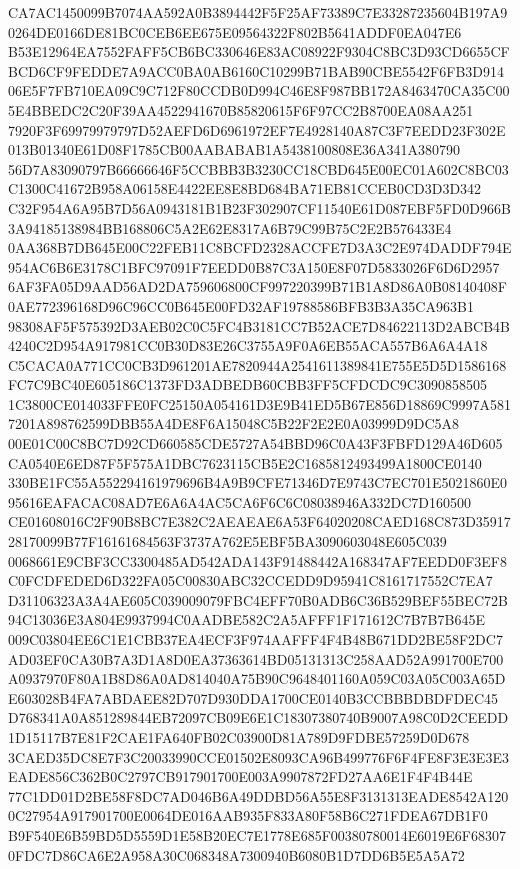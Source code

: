\documentclass[UTF8,fontset=fandol,zihao=-4,a4paper]{ctexart}
\begin{document}
{{CA7AC1450099B7074AA592A0B3894442F5F25AF73389C7E33287235604B197A90264DE0166DE81BC0CEB6EE675E09564322F802B5641ADDF0EA047E6
B53E12964EA7552FAFF5CB6BC330646E83AC08922F9304C8BC3D93CD6655CFBCD6CF9FEDDE7A9ACC0BA0AB6160C10299B71BAB90CBE5542F6FB3D914
06E5F7FB710EA09C9C712F80CCDB0D994C46E8F987BB172A8463470CA35C005E4BBEDC2C20F39AA4522941670B85820615F6F97CC2B8700EA08AA251
7920F3F69979979797D52AEFD6D6961972EF7E4928140A87C3F7EEDD23F302E013B01340E61D08F1785CB00AABABAB1A5438100808E36A341A380790
56D7A83090797B66666646F5CCBBB3B3230CC18CBD645E00EC01A602C8BC03C1300C41672B958A06158E4422EE8E8BD684BA71EB81CCEB0CD3D3D342
C32F954A6A95B7D56A0943181B1B23F302907CF11540E61D087EBF5FD0D966B3A94185138984BB168806C5A2E62E8317A6B79C99B75C2E2B576433E4
0AA368B7DB645E00C22FEB11C8BCFD2328ACCFE7D3A3C2E974DADDF794E954AC6B6E3178C1BFC97091F7EEDD0B87C3A150E8F07D5833026F6D6D2957
6AF3FA05D9AAD56AD2DA759606800CF997220399B71B1A8D86A0B08140408F0AE772396168D96C96CC0B645E00FD32AF19788586BFB3B3A35CA963B1
98308AF5F575392D3AEB02C0C5FC4B3181CC7B52ACE7D84622113D2ABCB4B4240C2D954A917981CC0B30D83E26C3755A9F0A6EB55ACA557B6A6A4A18
C5CACA0A771CC0CB3D961201AE7820944A2541611389841E755E5D5D1586168FC7C9BC40E605186C1373FD3ADBEDB60CBB3FF5CFDCDC9C3090858505
1C3800CE014033FFE0FC25150A054161D3E9B41ED5B67E856D18869C9997A5817201A898762599DBB55A4DE8F6A15048C5B22F2E2E0A03999D9DC5A8
00E01C00C8BC7D92CD660585CDE5727A54BBD96C0A43F3FBFD129A46D605CA0540E6ED87F5F575A1DBC7623115CB5E2C1685812493499A1800CE0140
330BE1FC55A552294161979696B4A9B9CFE71346D7E9743C7EC701E5021860E095616EAFACAC08AD7E6A6A4AC5CA6F6C6C08038946A332DC7D160500
CE01608016C2F90B8BC7E382C2AEAEAE6A53F64020208CAED168C873D3591728170099B77F16161684563F3737A762E5EBF5BA3090603048E605C039
0068661E9CBF3CC3300485AD542ADA143F91488442A168347AF7EEDD0F3EF8C0FCDFEDED6D322FA05C00830ABC32CCEDD9D95941C8161717552C7EA7
D31106323A3A4AE605C039009079FBC4EFF70B0ADB6C36B529BEF55BEC72B94C13036E3A804E9937994C0AADBE582C2A5AFFF1F171612C7B7B7B645E
009C03804EE6C1E1CBB37EA4ECF3F974AAFFF4F4B48B671DD2BE58F2DC7AD03EF0CA30B7A3D1A8D0EA37363614BD05131313C258AAD52A991700E700
A0937970F80A1B8D86A0AD814040A75B90C9648401160A059C03A05C003A65DE603028B4FA7ABDAEE82D707D930DDA1700CE0140B3CCBBBDBDFDEC45
D768341A0A851289844EB72097CB09E6E1C18307380740B9007A98C0D2CEEDD1D15117B7E81F2CAE1FA640FB02C03900D81A789D9FDBE57259D0D678
3CAED35DC8E7F3C20033990CCE01502E8093CA96B499776F6F4FE8F3E3E3E3EADE856C362B0C2797CB917901700E003A9907872FD27AA6E1F4F4B44E
77C1DD01D2BE58F8DC7AD046B6A49DDBD56A55E8F3131313EADE8542A1200C27954A917901700E0064DE016AAB935F833A80F58B6C271FDEA67DB1F0
B9F540E6B59BD5D5559D1E58B20EC7E1778E685F00380780014E6019E6F683070FDC7D86CA6E2A958A30C068348A7300940B6080B1D7DD6B5E5A5A72
}}
\end{document}
